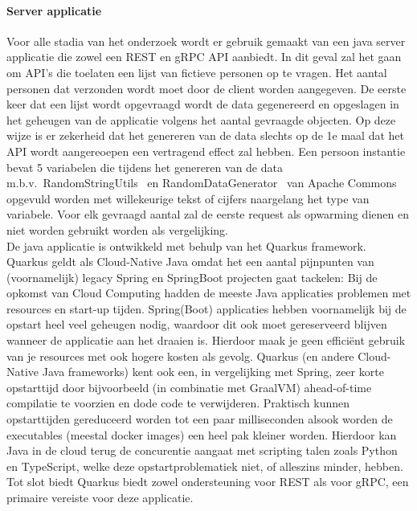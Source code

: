 \paragraph{Server applicatie}

Voor alle stadia van het onderzoek wordt er gebruik gemaakt van een java server applicatie die zowel een REST en gRPC API aanbiedt.
In dit geval zal het gaan om API's die toelaten een lijst van fictieve personen op te vragen. Het aantal personen dat verzonden wordt moet door de client worden aangegeven.
De eerste keer dat een lijst wordt opgevraagd wordt de data gegenereerd en opgeslagen in het geheugen van de applicatie volgens het aantal gevraagde objecten.
Op deze wijze is er zekerheid dat het genereren van de data slechts op de 1e maal dat het API wordt aangereoepen een vertragend effect zal hebben.
Een persoon instantie bevat 5 variabelen die tijdens het genereren van de data m.b.v.\ RandomStringUtils~\parencite{RandomStringUtils}
en RandomDataGenerator~\parencite{RandomDataGenerator} van Apache Commons opgevuld worden met willekeurige tekst of cijfers naargelang het type van variabele.
Voor elk gevraagd aantal zal de eerste request als opwarming dienen en niet worden gebruikt worden als vergelijking.\\

De java applicatie is ontwikkeld met behulp van het Quarkus framework. Quarkus geldt als Cloud-Native Java omdat het een aantal pijnpunten van (voornamelijk) legacy
Spring en SpringBoot projecten gaat tackelen: Bij de opkomst van Cloud Computing hadden de meeste Java applicaties problemen met resources en start-up tijden.
Spring(Boot) applicaties hebben voornamelijk bij de opstart heel veel geheugen nodig, waardoor dit ook moet gereserveerd blijven wanneer de applicatie aan het draaien is.
Hierdoor maak je geen effici\"ent gebruik van je resources met ook hogere kosten als gevolg. Quarkus (en andere Cloud-Native Java frameworks) kent ook een, in vergelijking met Spring,
zeer korte opstarttijd door bijvoorbeeld (in combinatie met GraalVM) ahead-of-time compilatie te voorzien en dode code te verwijderen.
Praktisch kunnen opstarttijden gereduceerd worden tot een paar milliseconden alsook worden de executables (meestal docker images) een heel pak kleiner worden.
Hierdoor kan Java in de cloud terug de concurentie aangaat met scripting talen zoals Python en TypeScript, welke deze opstartproblematiek niet, of alleszins minder, hebben.
Tot slot biedt Quarkus biedt zowel ondersteuning voor REST als voor gRPC, een primaire vereiste voor deze applicatie.\newline
~\autocite{reasonQuarkus}\\
~\autocite{whatisQuarkus}\\
~\autocite{reasonQuarkus2}\\
~\autocite{quarkusAbout}\\

